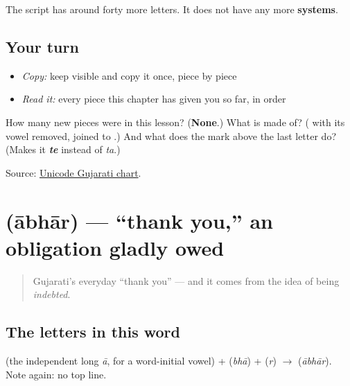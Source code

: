 The script has around forty more letters. It does not have any more \textbf{systems}.

\subsection*{Your turn}
\begin{itemize}
\raggedright
  \item \emph{Copy:} keep  visible and copy it once, piece by piece
  \item \emph{Read it:} every piece this chapter has given you so far, in order
\end{itemize}

\begin{tcolorbox}[breakable,colback=teal!4,colframe=teal!35!black,title={Before you move on}]
How many new pieces were in this lesson? (\textbf{None}.) What is \textbf{} made of? (\emph{\textbf{}} with its vowel removed, joined to \emph{\textbf{}}.) And what does the mark above the last letter do? (Makes it \emph{\textbf{te}} instead of \emph{ta}.)

Source: \href{https://www.unicode.org/charts/PDF/U0A80.pdf}{Unicode Gujarati chart}.
\end{tcolorbox}
\section[\gu{આભાર}]{ (ābhār) — \textquotedblleft{}thank you,\textquotedblright{} an obligation gladly owed}

\label{lesson:GU-C01-aabhaar}



\begin{quote}
Gujarati's everyday \textquotedblleft{}thank you\textquotedblright{} — and it comes from the idea of being \emph{indebted}.
\end{quote}

\subsection*{The letters in this word}
\textbf{} (the independent long \emph{ā}, for a word-initial vowel) + \textbf{} (\emph{bhā}) + \textbf{} (\emph{r}) $\to$ \textbf{} (\emph{ābhār}). Note again: no top line.

